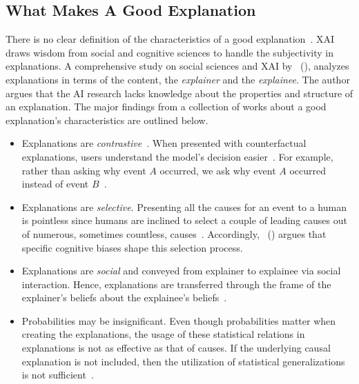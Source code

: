 \subsection{What Makes A Good Explanation}
\label{subsec:explainableArtificialIntelligence_AGoodExplanation}
There is no clear definition of the characteristics of a good explanation~\parencite{XAIConceptsTaxonomies_Arrieta}. XAI draws wisdom from social and cognitive sciences to handle the subjectivity in explanations. A comprehensive study on social sciences and XAI by~\citeauthor{ExplanationInAI_Miller} (\citeyear{ExplanationInAI_Miller}), analyzes explanations in terms of the content, the \emph{explainer} and the \emph{explainee}. The author argues that the AI research lacks knowledge about the properties and structure of an explanation. The major findings from a collection of works about a good explanation's characteristics are outlined below.
\begin{itemize}
    \item Explanations are \emph{contrastive}~\parencite{ContrastiveExplanation_Lipton, XAI_BewareInmatesRunningTheAsylum_Miller}. When presented with counterfactual explanations, users understand the model's decision easier~\parencite{ExplainableAndInterpretableModels_Escalante, MLCVPatternRecognition_Lopez, MLCVPatternRecognition_Lopez, CounterfactualsInXAI_Byrne}. For example, rather than asking why event $A$ occurred, we ask why event $A$ occurred instead of event $B$~\parencite{ExplanationInAI_Miller,XAIConceptsTaxonomies_Arrieta}.
    \item Explanations are \emph{selective}. Presenting all the causes for an event to a human is pointless since humans are inclined to select a couple of leading causes out of numerous, sometimes countless, causes~\parencite{ExplainingCollaborativeFiltering_Herlocker}. Accordingly,~\citeauthor{ExplanationInAI_Miller} (\citeyear{ExplanationInAI_Miller}) argues that specific cognitive biases shape this selection process.
    \item Explanations are \emph{social} and conveyed from explainer to explainee via social interaction. Hence, explanations are transferred through the frame of the explainer's beliefs about the explainee's beliefs~\parencite{ExplanationInAI_Miller}.
    \item Probabilities may be insignificant. Even though probabilities matter when creating the explanations, the usage of these statistical relations in explanations is not as effective as that of causes. If the underlying causal explanation is not included, then the utilization of statistical generalizations is not sufficient~\parencite{ExplanationInAI_Miller}.
\end{itemize}
